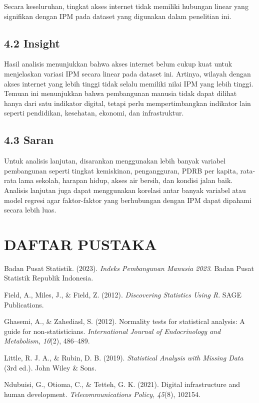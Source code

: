 \documentclass[
  indonesian,
  letterpaper,
  DIV=11,
  numbers=noendperiod]{scrartcl}
\begin{document}
Secara keseluruhan, tingkat akses internet tidak memiliki hubungan
linear yang signifikan dengan IPM pada dataset yang digunakan dalam
penelitian ini.

\subsection{4.2 Insight}\label{insight}

Hasil analisis menunjukkan bahwa akses internet belum cukup kuat untuk
menjelaskan variasi IPM secara linear pada dataset ini. Artinya, wilayah
dengan akses internet yang lebih tinggi tidak selalu memiliki nilai IPM
yang lebih tinggi. Temuan ini menunjukkan bahwa pembangunan manusia
tidak dapat dilihat hanya dari satu indikator digital, tetapi perlu
mempertimbangkan indikator lain seperti pendidikan, kesehatan, ekonomi,
dan infrastruktur.

\subsection{4.3 Saran}\label{saran}

Untuk analisis lanjutan, disarankan menggunakan lebih banyak variabel
pembangunan seperti tingkat kemiskinan, pengangguran, PDRB per kapita,
rata-rata lama sekolah, harapan hidup, akses air bersih, dan kondisi
jalan baik. Analisis lanjutan juga dapat menggunakan korelasi antar
banyak variabel atau model regresi agar faktor-faktor yang berhubungan
dengan IPM dapat dipahami secara lebih luas.

\section{DAFTAR PUSTAKA}\label{daftar-pustaka}

Badan Pusat Statistik. (2023). \emph{Indeks Pembangunan Manusia 2023}.
Badan Pusat Statistik Republik Indonesia.

Field, A., Miles, J., \& Field, Z. (2012). \emph{Discovering Statistics
Using R}. SAGE Publications.

Ghasemi, A., \& Zahediasl, S. (2012). Normality tests for statistical
analysis: A guide for non-statisticians. \emph{International Journal of
Endocrinology and Metabolism, 10}(2), 486--489.

Little, R. J. A., \& Rubin, D. B. (2019). \emph{Statistical Analysis
with Missing Data} (3rd ed.). John Wiley \& Sons.

Ndubuisi, G., Otioma, C., \& Tetteh, G. K. (2021). Digital
infrastructure and human development. \emph{Telecommunications Policy,
45}(8), 102154.
\end{document}
